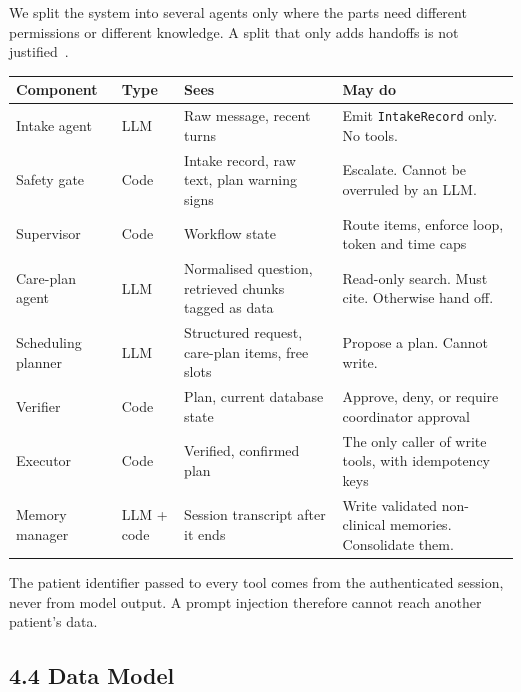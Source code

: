 \documentclass[11pt,a4paper]{article}
\begin{document}
We split the system into several agents only where the parts need different permissions or different knowledge. A split that only adds handoffs is not justified~\cite{mast}.

\begin{center}
\small
\begin{tabularx}{\textwidth}{>{\raggedright\arraybackslash}p{2.9cm} >{\raggedright\arraybackslash}p{1.6cm} L L}
\toprule
\textbf{Component} & \textbf{Type} & \textbf{Sees} & \textbf{May do} \\
\midrule
Intake agent & LLM & Raw message, recent turns & Emit \texttt{IntakeRecord} only. No tools. \\
Safety gate & Code & Intake record, raw text, plan warning signs & Escalate. Cannot be overruled by an LLM. \\
Supervisor & Code & Workflow state & Route items, enforce loop, token and time caps \\
Care-plan agent & LLM & Normalised question, retrieved chunks tagged as data & Read-only search. Must cite. Otherwise hand off. \\
Scheduling planner & LLM & Structured request, care-plan items, free slots & Propose a plan. Cannot write. \\
Verifier & Code & Plan, current database state & Approve, deny, or require coordinator approval \\
Executor & Code & Verified, confirmed plan & The only caller of write tools, with idempotency keys \\
Memory manager & LLM + code & Session transcript after it ends & Write validated non-clinical memories. Consolidate them. \\
\bottomrule
\end{tabularx}
\end{center}

The patient identifier passed to every tool comes from the authenticated session, never from model output. A prompt injection therefore cannot reach another patient's data.

\subsection*{4.4 Data Model}
\end{document}

